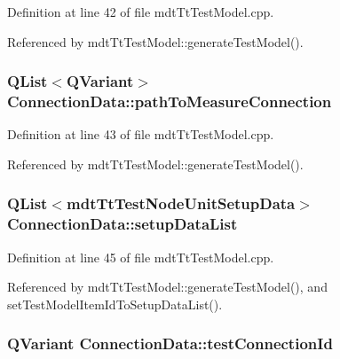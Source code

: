 Definition at line 42 of file mdt\-Tt\-Test\-Model.\-cpp.



Referenced by mdt\-Tt\-Test\-Model\-::generate\-Test\-Model().

\hypertarget{struct_connection_data_ab0f00378b10ebf0ca919884a68144097}{
\subsubsection[{path\-To\-Measure\-Connection}]{\setlength{\rightskip}{0pt plus 5cm}Q\-List$<$Q\-Variant$>$ Connection\-Data\-::path\-To\-Measure\-Connection}}\label{struct_connection_data_ab0f00378b10ebf0ca919884a68144097}


Definition at line 43 of file mdt\-Tt\-Test\-Model.\-cpp.



Referenced by mdt\-Tt\-Test\-Model\-::generate\-Test\-Model().

\hypertarget{struct_connection_data_a6aef86fe5e939ef8cdc4a159964b3d5e}{
\subsubsection[{setup\-Data\-List}]{\setlength{\rightskip}{0pt plus 5cm}Q\-List$<${\bf mdt\-Tt\-Test\-Node\-Unit\-Setup\-Data}$>$ Connection\-Data\-::setup\-Data\-List}}\label{struct_connection_data_a6aef86fe5e939ef8cdc4a159964b3d5e}


Definition at line 45 of file mdt\-Tt\-Test\-Model.\-cpp.



Referenced by mdt\-Tt\-Test\-Model\-::generate\-Test\-Model(), and set\-Test\-Model\-Item\-Id\-To\-Setup\-Data\-List().

\hypertarget{struct_connection_data_a3da4cbc16a1095b7585cb39025ab435d}{
\subsubsection[{test\-Connection\-Id}]{\setlength{\rightskip}{0pt plus 5cm}Q\-Variant Connection\-Data\-::test\-Connection\-Id}}\label{struct_connection_data_a3da4cbc16a1095b7585cb39025ab435d}


